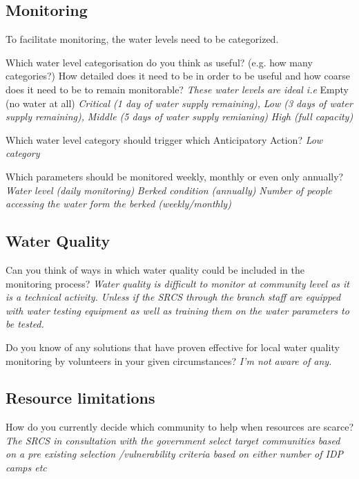 \subsection*{Monitoring}
To facilitate monitoring, the water levels need to be categorized.  

Which water level categorisation do you think as useful? (e.g. how many categories?) How detailed does it need to be in order to be useful and how coarse does it need to be to remain monitorable?  
\textit{These water levels are ideal i.e }\newline
Empty (no water at all) \newline
\textit{Critical (1 day of water supply remaining),}\newline
\textit{Low (3 days of water supply remaining),} \newline
\textit{Middle (5 days of water supply remianing)}\newline
\textit{High (full capacity)}\newline

Which water level category should trigger which Anticipatory Action?  
\textit{Low category}\newline

Which parameters should be monitored weekly, monthly or even only annually?  
\textit{Water level (daily monitoring)}\newline
\textit{Berked condition (annually)}\newline
\textit{Number of people accessing the water form the berked (weekly/monthly)}\newline


\subsection*{Water Quality}
Can you think of ways in which water quality could be included in the monitoring process? \newline
\textit{Water quality is difficult to monitor at community level as it is a technical activity. Unless if the SRCS through the branch staff are equipped with water testing equipment as well as training them on the water parameters to be tested.}

Do you know of any solutions that have proven effective for local water quality monitoring by volunteers in your given circumstances?  
\textit{I'm not aware of any.}

\subsection*{Resource limitations}
How do you currently decide which community to help when resources are scarce?\newline
\textit{The SRCS in consultation with the government select target communities based on a pre existing selection /vulnerability criteria based on either number of IDP camps etc}

